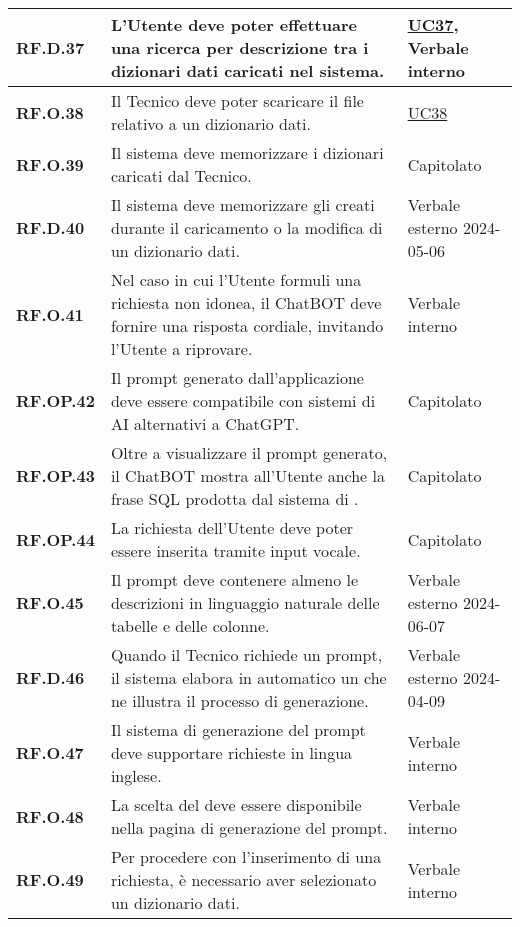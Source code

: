 \begin{adjustwidth}{-0.5cm}{-0.5cm}
\begin{longtable}{|P{3cm}|P{6,5cm}|>{\arraybackslash}P{4cm}|}
    \hline
    \textbf{RF.D.37} & L'Utente deve poter effettuare una ricerca per descrizione tra i dizionari dati caricati nel sistema. & \hyperref[UC37]{UC37}, Verbale interno \\
    \hline
    \textbf{RF.O.38} & Il Tecnico deve poter scaricare il file relativo a un dizionario dati. & \hyperref[UC38]{UC38} \\
    \hline
    \textbf{RF.O.39} & Il sistema deve memorizzare i dizionari caricati dal Tecnico. & Capitolato \\
    \hline
    \textbf{RF.D.40} & Il sistema deve memorizzare gli  creati durante il caricamento o la modifica di un dizionario dati. & Verbale esterno 2024-05-06\\
    \hline
    \textbf{RF.O.41} & Nel caso in cui l'Utente formuli una richiesta non idonea, il ChatBOT deve fornire una risposta cordiale, invitando l'Utente a riprovare. & Verbale interno \\
    \hline
    \textbf{RF.OP.42} & Il prompt generato dall'applicazione deve essere compatibile con sistemi di AI alternativi a ChatGPT. & Capitolato \\
    \hline
    \textbf{RF.OP.43} & Oltre a visualizzare il prompt generato, il ChatBOT mostra all'Utente anche la frase SQL prodotta dal sistema di . & Capitolato \\
    \hline
    \textbf{RF.OP.44} & La richiesta dell'Utente deve poter essere inserita tramite input vocale. & Capitolato \\
    \hline
    \textbf{RF.O.45} & Il prompt deve contenere almeno le descrizioni in linguaggio naturale delle tabelle e delle colonne. & Verbale esterno 2024-06-07\\
    \hline
    \textbf{RF.D.46} & Quando il Tecnico richiede un prompt, il sistema elabora in automatico un  che ne illustra il processo di generazione. & Verbale esterno 2024-04-09 \\
    \hline
    \textbf{RF.O.47} & Il sistema di generazione del prompt deve supportare richieste in lingua inglese. & Verbale interno \\
    \hline
    \textbf{RF.O.48} & La scelta del  deve essere disponibile nella pagina di generazione del prompt. & Verbale interno \\
    \hline
    \textbf{RF.O.49} & Per procedere con l'inserimento di una richiesta, è necessario aver selezionato un dizionario dati. & Verbale interno \\
    \hline

\end{longtable}
\end{adjustwidth}
